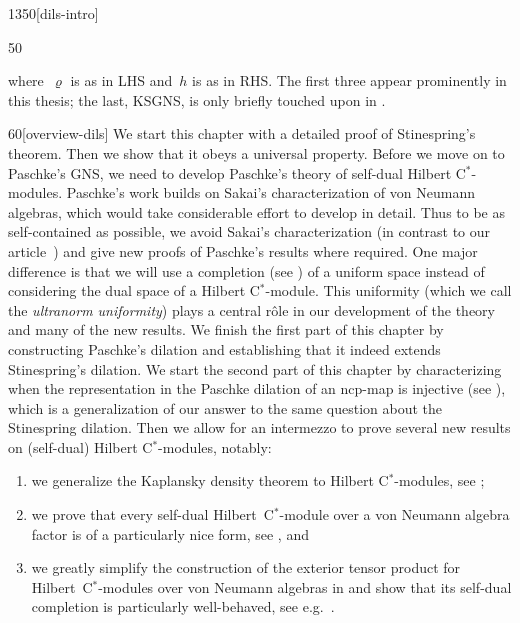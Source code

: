 \begin{parsec}{1350}[dils-intro]
\begin{point}{50}
\begin{center}
{        where~$\varrho$ is as in LHS
        and~$h$ is as in RHS.
    The first three appear prominently in this thesis;
        the last, KSGNS, is only briefly touched upon in .}
\end{center}
\spacingfix{} %
\spacingfix{}
\begin{point}{60}[overview-dils]%
We start this chapter with a detailed proof of Stinespring's theorem.
Then we show that it obeys a universal property.
Before we move on to Paschke's GNS,
    we need to develop Paschke's theory of self-dual Hilbert C$^*$-modules.
Paschke's work builds on Sakai's characterization of von Neumann algebras,
    which would take considerable effort to develop in detail.
Thus to be as self-contained as possible,
    we avoid Sakai's characterization (in contrast to our
        article~\cite{wwpaschke})
    and give new proofs
    of Paschke's results where required.
One major difference is that we will use
    a completion (see ) of a uniform space
    instead of considering the dual space of a Hilbert C$^*$-module.
This uniformity (which we call the \emph{ultranorm uniformity})
    plays a central r\^ole
    in our development of the theory
    and many of the new results.
We finish the first part of this chapter
    by constructing Paschke's dilation
    and establishing that it indeed extends Stinespring's dilation.
We start the second part of this chapter
    by characterizing when the representation in the Paschke dilation
    of an ncp-map is injective (see ),
    which is a generalization of our answer \cite{stineinj}
    to the same question about the Stinespring dilation.
Then we allow for an intermezzo
    to prove several new results on (self-dual) Hilbert C$^*$-modules,
    notably:
\begin{enumerate}
    \item
    we generalize the Kaplansky density theorem
    to Hilbert C$^*$-modules, see ;
    \item
   we prove that every self-dual Hilbert~C$^*$-module over
            a von Neumann algebra factor
            is of a particularly nice form,
            see , and
    \item
    we greatly simplify the construction of the exterior tensor product
        for Hilbert~C$^*$-modules over von Neumann algebras
        in 
        and show that its self-dual completion
        is particularly well-behaved, see e.g.~.

\end{enumerate}
\end{point}
\end{point}
\end{parsec}
